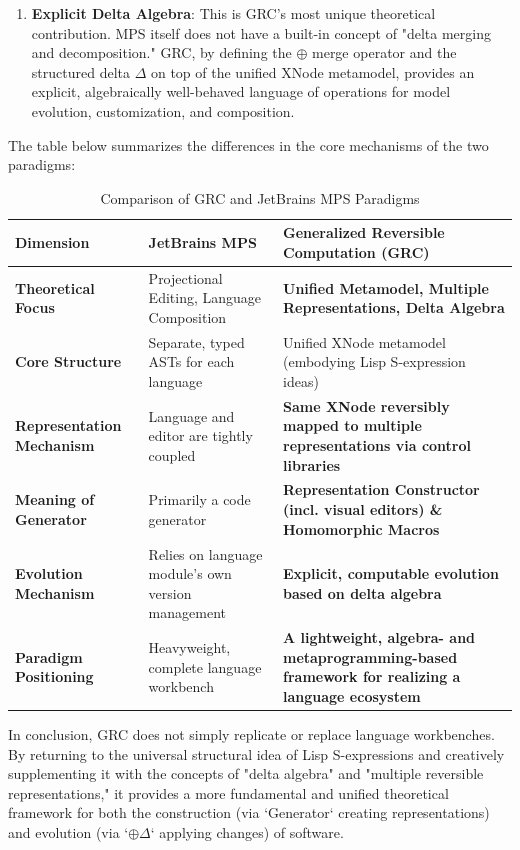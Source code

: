 \documentclass[11pt]{article}
\begin{document}
\begin{enumerate}
    \item \textbf{Explicit Delta Algebra}: This is GRC's most unique theoretical contribution. MPS itself does not have a built-in concept of "delta merging and decomposition." GRC, by defining the $\oplus$ merge operator and the structured delta $\Delta$ on top of the unified XNode metamodel, provides an explicit, algebraically well-behaved language of operations for model evolution, customization, and composition.
\end{enumerate}

The table below summarizes the differences in the core mechanisms of the two paradigms:

\begin{table}[htbp]
\centering
\caption{Comparison of GRC and JetBrains MPS Paradigms}
\begin{tabularx}{\textwidth}{@{} l X X @{}}
\toprule
\textbf{Dimension} & \textbf{JetBrains MPS} & \textbf{Generalized Reversible Computation (GRC)} \\
\midrule
\textbf{Theoretical Focus} & Projectional Editing, Language Composition & \textbf{Unified Metamodel, Multiple Representations, Delta Algebra} \\
\addlinespace
\textbf{Core Structure} & Separate, typed ASTs for each language & Unified XNode metamodel (embodying Lisp S-expression ideas) \\
\addlinespace
\textbf{Representation Mechanism} & Language and editor are tightly coupled & \textbf{Same XNode reversibly mapped to multiple representations via control libraries} \\
\addlinespace
\textbf{Meaning of Generator} & Primarily a code generator & \textbf{Representation Constructor (incl. visual editors) \& Homomorphic Macros} \\
\addlinespace
\textbf{Evolution Mechanism} & Relies on language module's own version management & \textbf{Explicit, computable evolution based on delta algebra} \\
\addlinespace
\textbf{Paradigm Positioning} & Heavyweight, complete language workbench & \textbf{A lightweight, algebra- and metaprogramming-based framework for realizing a language ecosystem} \\
\bottomrule
\end{tabularx}
\end{table}

In conclusion, GRC does not simply replicate or replace language workbenches. By returning to the universal structural idea of Lisp S-expressions and creatively supplementing it with the concepts of "delta algebra" and "multiple reversible representations," it provides a more fundamental and unified theoretical framework for both the construction (via `Generator` creating representations) and evolution (via `$\oplus \Delta$` applying changes) of software.
\end{document}
